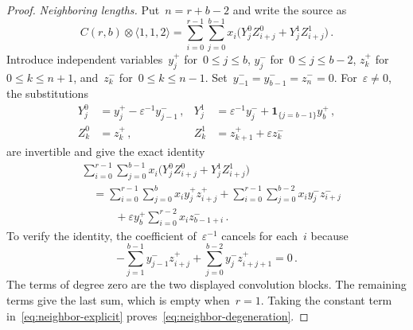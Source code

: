 \documentclass[11pt,letterpaper]{article}
\theoremstyle{definition}
\numberwithin{equation}{section}
\begin{document}
\begin{proof}
\emph{Neighboring lengths.} Put~$n=r+b-2$ and write the source as
\begin{equation*}
 C(r,b)\otimes \langle1,1,2\rangle=\sum_{i=0}^{r-1}\sum_{j=0}^{b-1}
 x_i\bigl(Y_j^0Z_{i+j}^0+Y_j^1Z_{i+j}^1\bigr)\,.
\end{equation*}
Introduce independent variables~$y_j^+$ for~$0\leq j\leq b$, $y_j^-$ for~$0\leq j\leq b-2$, $z_k^+$ for~$0\leq k\leq n+1$, and~$z_k^-$ for~$0\leq k\leq n-1$. Set~$y_{-1}^-=y_{b-1}^-=z_n^-=0$. For~$\varepsilon\ne0$, the substitutions
\begin{equation}\label{eq:neighbor-substitution}
\begin{aligned}
 Y_j^0&=y_j^+-\varepsilon^{-1}y_{j-1}^-\,,&
 Y_j^1&=\varepsilon^{-1}y_j^-+\mathbf1_{\{j=b-1\}}y_b^+\,,\\
 Z_k^0&=z_k^+\,,&
 Z_k^1&=z_{k+1}^++\varepsilon z_k^-
\end{aligned}
\end{equation}
are invertible and give the exact identity
\begin{equation}\label{eq:neighbor-explicit}
\begin{aligned}
 &\sum_{i=0}^{r-1}\sum_{j=0}^{b-1}
 x_i\bigl(Y_j^0Z_{i+j}^0+Y_j^1Z_{i+j}^1\bigr)\\
 &\quad=\sum_{i=0}^{r-1}\sum_{j=0}^{b}x_i y_j^+z_{i+j}^+
 +\sum_{i=0}^{r-1}\sum_{j=0}^{b-2}x_i y_j^-z_{i+j}^- \\
 &\qquad\quad+\varepsilon y_b^+\sum_{i=0}^{r-2}x_i z_{b-1+i}^-\,.
\end{aligned}
\end{equation}
To verify the identity, the coefficient of~$\varepsilon^{-1}$ cancels for each~$i$ because
\begin{equation*}
 -\sum_{j=1}^{b-1}y_{j-1}^-z_{i+j}^+
 +\sum_{j=0}^{b-2}y_j^-z_{i+j+1}^+=0\,.
\end{equation*}
The terms of degree zero are the two displayed convolution blocks. The remaining terms give the last sum, which is empty when~$r=1$. Taking the constant term in~\eqref{eq:neighbor-explicit} proves~\eqref{eq:neighbor-degeneration}.


\end{proof}
\end{document}
